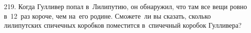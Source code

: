 219. Когда Гулливер попал в Лилипутию, он обнаружил, что там все вещи ровно в 12 раз короче, чем на его родине. Сможете ли вы сказать, сколько лилипутских спичечных коробков поместится в спичечный коробок Гулливера?\\

